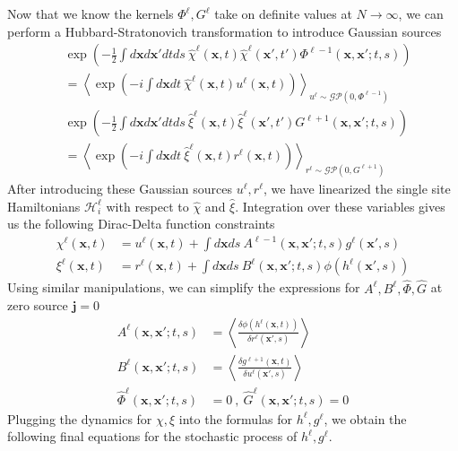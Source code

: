 \documentclass{article} %
\def\x{\bm x}
\begin{document}
Now that we know the kernels $\Phi^\ell, G^\ell$ take on definite values at $N \to \infty$, we can perform a Hubbard-Stratonovich transformation to introduce Gaussian sources
\begin{align}
    &\exp\left( - \frac{1}{2} \int d\x d\x' dt ds \  \hat\chi^\ell(\x,t) \hat\chi^\ell(\x',t') \Phi^{\ell-1}(\x,\x';t,s) \right) \nonumber 
    \\
    &= \left< \exp\left( - i \int d\x dt \  \hat\chi^\ell(\x,t) u^\ell(\x,t)   \right) \right>_{u^\ell \sim \mathcal{GP}(0,\Phi^{\ell-1})}
    \\
    &\exp\left( - \frac{1}{2} \int d\x d\x' dt ds \  \hat\xi^\ell(\x,t) \hat\xi^\ell(\x',t') G^{\ell+1}(\x,\x';t,s) \right) \nonumber 
    \\
    &= \left< \exp\left( - i \int d\x dt \  \hat\xi^\ell(\x,t) r^\ell(\x,t)   \right) \right>_{r^\ell \sim \mathcal{GP}(0,G^{\ell+1})}
\end{align}
After introducing these Gaussian sources $u^\ell, r^\ell$, we have linearized the single site Hamiltonians $\mathcal H_i^\ell$ with respect to $\hat\chi$ and $\hat\xi$. Integration over these variables gives us the following Dirac-Delta function constraints
\begin{align}
    \chi^\ell(\x,t) &= u^\ell(\x,t) + \int d\x ds \  A^{\ell-1}(\x,\x';t,s) g^{\ell}(\x',s) \nonumber
    \\
    \xi^{\ell}(\x,t) &= r^\ell(\x,t) + \int d\x ds \ B^\ell(\x,\x';t,s) \phi(h^\ell(\x',s))  
\end{align}
Using similar manipulations, we can simplify the expressions for $A^\ell, B^\ell, \hat\Phi, \hat G$ at zero source $\bm j = 0$
\begin{align}
    A^{\ell}(\x,\x';t,s) &= \left< \frac{\delta \phi(h^\ell(\x,t))}{\delta r^\ell(\x',s)} \right> \nonumber
    \\
    B^{\ell}(\x,\x';t,s) &= \left< \frac{\delta g^{\ell+1}(\x,t)}{\delta u^\ell(\x',s)} \right> \nonumber
    \\
    \hat\Phi^\ell(\x,\x';t,s) &= 0 \ , \ \hat G^\ell(\x,\x';t,s)  = 0
\end{align}
Plugging the dynamics for $\chi, \xi$ into the formulas for $h^\ell, g^\ell$, we obtain the following final equations for the stochastic process of $h^\ell, g^\ell$. 
\end{document}
